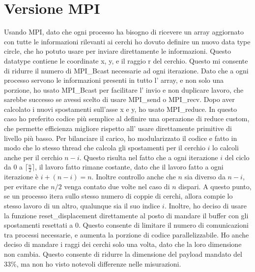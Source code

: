 \documentclass[a4paper,11pt, twoside]{report}
\begin{document}
\section*{Versione MPI}
Usando MPI, dato che ogni processo ha bisogno di ricevere un array aggiornato con tutte le informazioni rilevanti ai cerchi
ho dovuto definire un nuovo data type circle, che ho potuto usare per inviare direttamente le informazioni.
Questo datatype contiene le coordinate x, y, e il raggio r del cerchio. %
Questo mi consente di ridurre il numero di MPI\_Bcast necessarie ad ogni iterazione.
Dato che a ogni processo servono le informazioni presenti in tutto l' array, e non solo una porzione, ho usato MPI\_Bcast per facilitare l' invio e non duplicare lavoro,
che sarebbe successo se avessi scelto di usare MPI\_send o  MPI\_recv.
Dopo aver calcolato i nuovi spostamenti sull'asse x e y, ho usato MPI\_reduce.
In questo caso ho preferito codice più semplice al definire una operazione di reduce custom,
che permette efficienza migliore rispetto all' usare direttamente primitive di livello più basso.
Per bilanciare il carico, ho modularizzato il codice e fatto in modo che lo stesso thread che calcola gli spostamenti per il cerchio $i$ lo calcoli anche per il cerchio $n-i$.
Questo risulta nel fatto che a ogni iterazione $i$ del ciclo da $0$ a $\lceil \frac{n}{2} \rceil$, il lavoro fatto rimane costante, dato che il lavoro fatto a ogni iterazione è $i + (n-i) = n$.
Inoltre controllo anche che $n$ sia diverso da $n-i$, per evitare che $n/2$ venga contato due volte nel caso di $n$ dispari.
A questo punto, se un processo itera sullo stesso numero di coppie di cerchi, allora compie lo stesso lavoro di un altro, qualunque sia il suo indice $i$.
Inoltre, ho deciso di usare la funzione reset\_displacement direttamente al posto di mandare il buffer con gli spostamenti resettati a 0.
Questo consente di limitare il numero di comunicazioni tra processi necessarie, e aumenta la porzione di codice parallelizzabile.
Ho anche deciso di mandare i raggi dei cerchi solo una volta, dato che la loro dimensione non cambia.
Questo consente di ridurre la dimensione del payload mandato del 33\%, ma non ho visto notevoli differenze nelle misurazioni.
\end{document}
